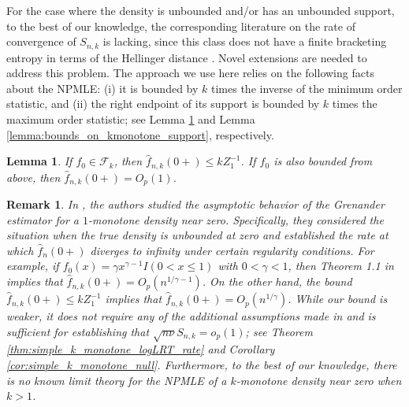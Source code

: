 \documentclass[12pt,letterpaper, twoside, openany]{article}
\theoremstyle{plain}
\newtheorem{lemma}[theorem]{Lemma}
\newtheorem{remark}[theorem]{Remark}
\begin{document}
	
	For the case where the density is unbounded and/or has an unbounded support, to the best of our knowledge, the corresponding literature on the rate of convergence of $S_{n,k}$ is lacking, since this class does not have a finite bracketing entropy in terms of the Hellinger distance \citep{gao2009rate}.  Novel extensions are needed to address this problem. The approach we use here relies on the following facts about the NPMLE: (i) it is bounded by $k$ times the  inverse of the minimum order statistic, and (ii) the right endpoint of its support is bounded by $k$ times the maximum order statistic; see Lemma \ref{lemma:k_monotone_bounded_in_prob} and Lemma \ref{lemma:bounds_on_kmonotone_support}, respectively. 
	
	
	
	
	
	\begin{lemma}\label{lemma:k_monotone_bounded_in_prob}
		If $f_0 \in \mathcal{F}_k$, then $\hat{f}_{n,k}(0+) \leq k Z^{-1}_1$.	If $f_0$ is also bounded from above, then $\hat{f}_{n,k}(0+) = O_p(1)$.
	\end{lemma}
	
	\begin{remark}
		In \cite{Balabdaoui2011grenander}, the authors studied the asymptotic behavior of the Grenander estimator for a $1$-monotone density near zero. Specifically, they considered the situation when the true density is unbounded at zero and established the rate at which $\hat{f}_n(0+)$ diverges to infinity under certain regularity conditions. For example, if $f_0(x) = \gamma x^{\gamma -1}I(0 < x \leq 1)$ with $0<\gamma<1$, then Theorem 1.1 in \cite{Balabdaoui2011grenander} implies that $\hat{f}_{n,k}(0+) = O_p(n^{1/\gamma - 1})$. On the other hand, the bound $\hat{f}_{n,k}(0+) \leq k Z^{-1}_1$ implies that $\hat{f}_{n,k}(0+) = O_p(n^{1/\gamma})$. While our bound is weaker, it does not require any of the additional assumptions made in \cite{Balabdaoui2011grenander} and is sufficient for establishing that $\sqrt{n\nu} S_{n,k} = o_p(1)$; see Theorem \ref{thm:simple_k_monotone_logLRT_rate} and Corollary \ref{cor:simple_k_monotone_null}. Furthermore, to the best of our knowledge, there is no known limit theory for the NPMLE of a $k$-monotone density near zero when $k > 1$.
	\end{remark}
	
\end{document}
